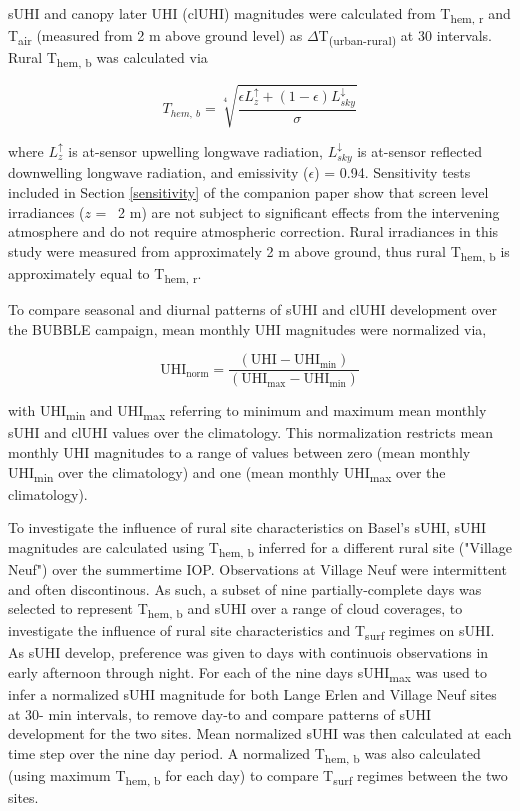 \begin{bibunit}
sUHI and canopy later UHI (clUHI) magnitudes were calculated from T\textsubscript{hem, r} and T\textsubscript{air} (measured from 2 \si{\meter} above ground level) as $\Delta$T\textsubscript{(urban-rural)} at 30 \si{\min} intervals. Rural T\textsubscript{hem, b} was calculated via

\begin{equation}
\label{ruralt}
T_{hem,~ b} = \sqrt[4]{\frac{\epsilon L_z^\uparrow + (1 - \epsilon)L_{sky}^\downarrow}{\sigma}}
\end{equation}

\noindent where $L_z^\uparrow$ is at-sensor upwelling longwave radiation, $L_{sky}^\downarrow$ is at-sensor reflected downwelling longwave radiation, and emissivity ($\epsilon$) = 0.94. Sensitivity tests included in Section \ref{sensitivity} of the companion paper show that screen level irradiances ($ z $ = ~2 \si{\meter}) are not subject to significant effects from the intervening atmosphere and do not require atmospheric correction. Rural irradiances in this study were measured from approximately 2 \si{\meter} above ground, thus rural T\textsubscript{hem, b} is approximately equal to T\textsubscript{hem, r}. 

To compare seasonal and diurnal patterns of sUHI and clUHI development over the BUBBLE campaign, mean monthly UHI magnitudes were normalized via,

\begin{equation}
\text{UHI}_{\text{norm}} = \frac{(\text{UHI} - \text{UHI}_{\text{min}})}{(\text{UHI}_{\text{max}} - \text{UHI}_{\text{min}})}
\label{uhinorm}
\end{equation}

\noindent with UHI\textsubscript{min} and UHI\textsubscript{max} referring to minimum and maximum mean monthly sUHI and clUHI values over the climatology. This normalization restricts mean monthly UHI magnitudes to a range of values between zero (mean monthly UHI\textsubscript{min} over the climatology) and one (mean monthly UHI\textsubscript{max} over the climatology).

To investigate the influence of rural site characteristics on Basel's sUHI, sUHI magnitudes are calculated using T\textsubscript{hem, b} inferred for a different rural site ("Village Neuf") over the summertime IOP. Observations at Village Neuf were intermittent and often discontinous. As such, a subset of nine partially-complete days was selected to represent T\textsubscript{hem, b} and sUHI over a range of cloud coverages, to investigate the influence of rural site characteristics and T\textsubscript{surf} regimes on sUHI. As sUHI develop, preference was given to days with continuois observations in early afternoon through night. For each of the nine days sUHI\textsubscript{max} was used to infer a normalized sUHI magnitude for both Lange Erlen and Village Neuf sites at 30- \si{\minute} intervals, to remove day-to and compare patterns of sUHI development for the two sites. Mean normalized sUHI was then calculated at each time step over the nine day period. A normalized T\textsubscript{hem, b} was also calculated (using maximum T\textsubscript{hem, b} for each day) to compare T\textsubscript{surf} regimes between the two sites.


\end{bibunit}
